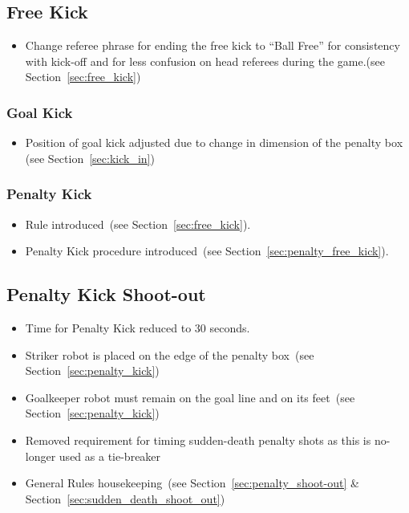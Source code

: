 \documentclass[12pt]{article}
\newcommand{\cf}{see\xspace}
\newcommand{\PenaltyKickTime}{30 seconds\xspace}
\begin{document}
\subsection*{Free Kick}
\begin{itemize}
  \item Change referee phrase for ending the free kick to ``Ball Free'' for consistency with kick-off and for less confusion on  head referees during the game.(\cf Section~\ref{sec:free_kick})
\end{itemize}

\subsubsection*{Goal Kick}
\begin{itemize}
  \item Position of goal kick adjusted due to change in dimension of the penalty box (\cf Section~\ref{sec:kick_in})
\end{itemize}

\subsubsection*{Penalty Kick}
\begin{itemize}
  \item Rule introduced~(\cf Section~\ref{sec:free_kick}).
  \item Penalty Kick procedure introduced~(\cf Section~\ref{sec:penalty_free_kick}).
\end{itemize}

\subsection*{Penalty Kick Shoot-out}
\begin{itemize}
  \item Time for Penalty Kick reduced to \PenaltyKickTime.
  \item Striker robot is placed on the edge of the penalty box~(\cf Section~\ref{sec:penalty_kick})
  \item Goalkeeper robot must remain on the goal line and on its feet~(\cf Section~\ref{sec:penalty_kick})
  \item Removed requirement for timing sudden-death penalty shots as this is no-longer used as a tie-breaker
  \item General Rules housekeeping~(\cf Section~\ref{sec:penalty_shoot-out} \& Section~\ref{sec:sudden_death_shoot_out})
\end{itemize}
\end{document}
